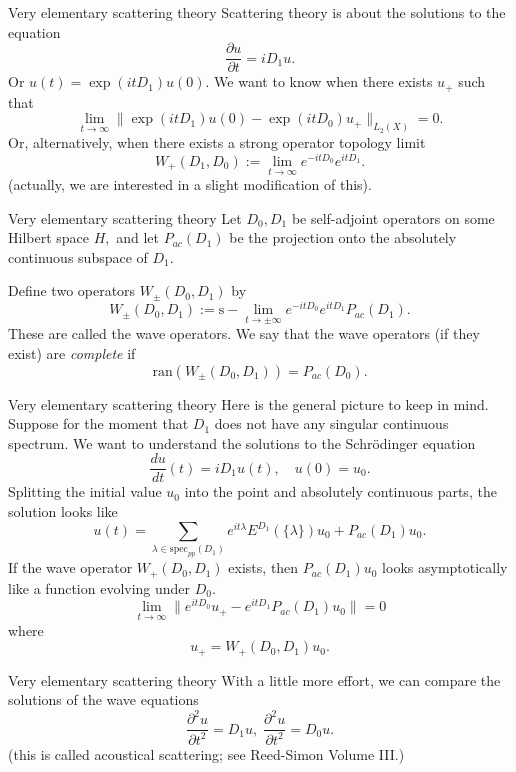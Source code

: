 \documentclass{beamer}
\numberwithin{equation}{section}
\theoremstyle{plain}
\theoremstyle{plain}
\theoremstyle{definition}
\theoremstyle{plain}
\theoremstyle{plain}
\theoremstyle{definition}
\begin{document}
\begin{frame}{Very elementary scattering theory}
  Scattering theory is about the solutions to the equation
  \[
    \frac{\partial u}{\partial t} = iD_1u.
  \]
  Or $u(t) = \exp(itD_1)u(0).$ We want to know when
  there exists $u_+$ such that
  \[
      \lim_{t\to\infty} \|\exp(itD_1)u(0)-\exp(itD_0)u_+\|_{L_2(X)} = 0.
  \]
  Or, alternatively, when there exists a strong operator topology limit
  \[
    W_+(D_1,D_0) := \lim_{t\to\infty} e^{-itD_0}e^{itD_1}.
  \]
  (actually, we are interested in a slight modification of this).
\end{frame}


\begin{frame}{Very elementary scattering theory}
  Let $D_0,D_1$ be self-adjoint operators on some Hilbert space $H,$ and let $P_{ac}(D_1)$ be the projection onto the absolutely continuous subspace of $D_1.$

  Define two operators $W_{\pm}(D_0,D_1)$ by
  \[
    W_{\pm}(D_0,D_1) := {\mathrm{s}-}\lim_{t\to\pm \infty} e^{-itD_0}e^{itD_1}P_{ac}(D_1).
  \]
  These are called the wave operators. We say that the wave operators (if they exist) are \emph{complete}
  if
  \[
      \mathrm{ran}(W_{\pm}(D_0,D_1)) = P_{ac}(D_0).
  \]
\end{frame}

\begin{frame}{Very elementary scattering theory}
  Here is the general picture to keep in mind. Suppose for the moment that $D_1$ does not have any singular continuous spectrum. We want to understand the solutions to the Schr\"odinger equation
  \[
    \frac{du}{dt}(t) = iD_1u(t),\quad u(0) = u_0.
  \]
  Splitting the initial value $u_0$ into the point and absolutely continuous parts, the solution looks like
  \[
    u(t) = \sum_{\lambda \in \mathrm{spec}_{pp}(D_1)} e^{it\lambda}E^{D_1}(\{\lambda\})u_0 + P_{ac}(D_1)u_0.
  \]
  If the wave operator $W_{+}(D_0,D_1)$ exists, then $P_{ac}(D_1)u_0$ looks asymptotically like a function evolving under $D_0.$
  \[
      \lim_{t\to\infty} \|e^{itD_0}u_+ - e^{itD_1}P_{ac}(D_1)u_0\| = 0
  \]
  where
  \[
      u_+ =W_+(D_0,D_1)u_0.
  \]
\end{frame}


\begin{frame}{Very elementary scattering theory}
  With a little more effort, we can compare the solutions of the wave equations
  \[
    \frac{\partial^2 u}{\partial t^2} = D_1u,\; \frac{\partial^2 u}{\partial t^2} = D_0u.
  \]
  (this is called acoustical scattering; see Reed-Simon Volume III.)
\end{frame}
\end{document}
